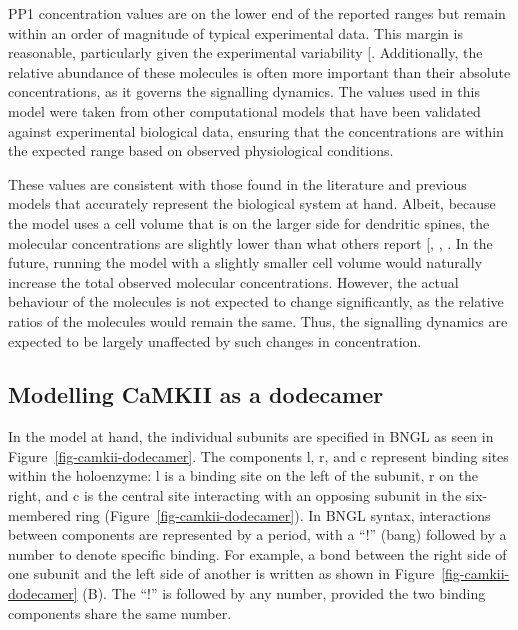 \documentclass[
  11pt,
  letterpaper,
]{scrreprt}
\begin{document}
PP1 concentration values are on the lower end of the reported ranges but
remain within an order of magnitude of typical experimental data. This
margin is reasonable, particularly given the experimental variability
{[}\citeproc{ref-eastwood2006Minimum}{448}{]}. Additionally, the
relative abundance of these molecules is often more important than their
absolute concentrations, as it governs the signalling dynamics. The
values used in this model were taken from other computational models
that have been validated against experimental biological data, ensuring
that the concentrations are within the expected range based on observed
physiological conditions.

These values are consistent with those found in the literature and
previous models that accurately represent the biological system at hand.
Albeit, because the model uses a cell volume that is on the larger side
for dendritic spines, the molecular concentrations are slightly lower
than what others report {[},
,
\citeproc{ref-yasuda2022CaMKIIa}{449}{]}. In the future, running the
model with a slightly smaller cell volume would naturally increase the
total observed molecular concentrations. However, the actual behaviour
of the molecules is not expected to change significantly, as the
relative ratios of the molecules would remain the same. Thus, the
signalling dynamics are expected to be largely unaffected by such
changes in concentration.

\subsection{Modelling CaMKII as a
dodecamer}\label{sec-camkii-as-dodecamer}

In the model at hand, the individual subunits are specified in BNGL as
seen in Figure~\ref{fig-camkii-dodecamer}. The components l, r, and c
represent binding sites within the holoenzyme: l is a binding site on
the left of the subunit, r on the right, and c is the central site
interacting with an opposing subunit in the six-membered ring
(Figure~\ref{fig-camkii-dodecamer}). In BNGL syntax, interactions
between components are represented by a period, with a ``!'' (bang)
followed by a number to denote specific binding. For example, a bond
between the right side of one subunit and the left side of another is
written as shown in Figure~\ref{fig-camkii-dodecamer} (B). The ``!'' is
followed by any number, provided the two binding components share the
same number.
\end{document}

